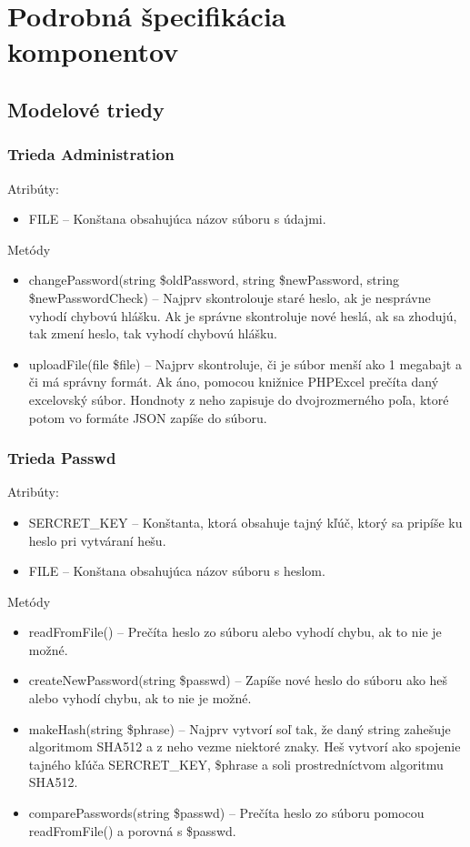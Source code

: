 \documentclass[12pt,a4paper]{report}
\begin{document}
\chapter[Podrobná špecifikácia komponentov]{\rmfamily\bfseries
	Podrobná špecifikácia komponentov}

\section[Modelové triedy]{\rmfamily\bfseries
	Modelové triedy}

\subsection[Trieda Administration]{\rmfamily\bfseries
	Trieda Administration}
Atribúty:
\begin{itemize}
	\item FILE – Konštana obsahujúca názov súboru s údajmi. 
\end{itemize}
Metódy
\begin{itemize}
	\item changePassword(string \$oldPassword, string \$newPassword, string \$newPasswordCheck) – Najprv skontrolouje staré heslo, ak je nesprávne vyhodí chybovú hlášku. Ak je správne skontroluje nové heslá, ak sa zhodujú, tak zmení heslo, tak vyhodí chybovú hlášku.
	\item uploadFile(file \$file) – Najprv skontroluje, či je súbor menší ako 1 megabajt a či má správny formát. Ak áno, pomocou knižnice PHPExcel prečíta daný excelovský súbor. Hondnoty z neho zapisuje do dvojrozmerného poľa, ktoré potom vo formáte JSON zapíše do súboru.
\end{itemize}

\subsection[Trieda Passwd]{\rmfamily\bfseries
	Trieda Passwd}
Atribúty:
\begin{itemize}
	\item SERCRET\_KEY – Konštanta, ktorá obsahuje tajný kľúč, ktorý sa pripíše ku heslo pri vytváraní hešu. 
	\item FILE – Konštana obsahujúca názov súboru s heslom.
\end{itemize}
Metódy
\begin{itemize}
	\item readFromFile() – Prečíta heslo zo súboru alebo vyhodí chybu, ak to nie je možné.
	\item createNewPassword(string \$passwd) – Zapíše nové heslo do súboru ako heš alebo vyhodí chybu, ak to nie je možné.
	\item makeHash(string \$phrase) – Najprv vytvorí soľ tak, že daný string zahešuje algoritmom SHA512 a z neho vezme niektoré znaky. Heš vytvorí ako spojenie tajného kľúča SERCRET\_KEY, \$phrase a soli prostredníctvom algoritmu SHA512.
	\item comparePasswords(string \$passwd) – Prečíta heslo zo súboru pomocou readFromFile() a porovná s  \$passwd.
\end{itemize}
\end{document}
